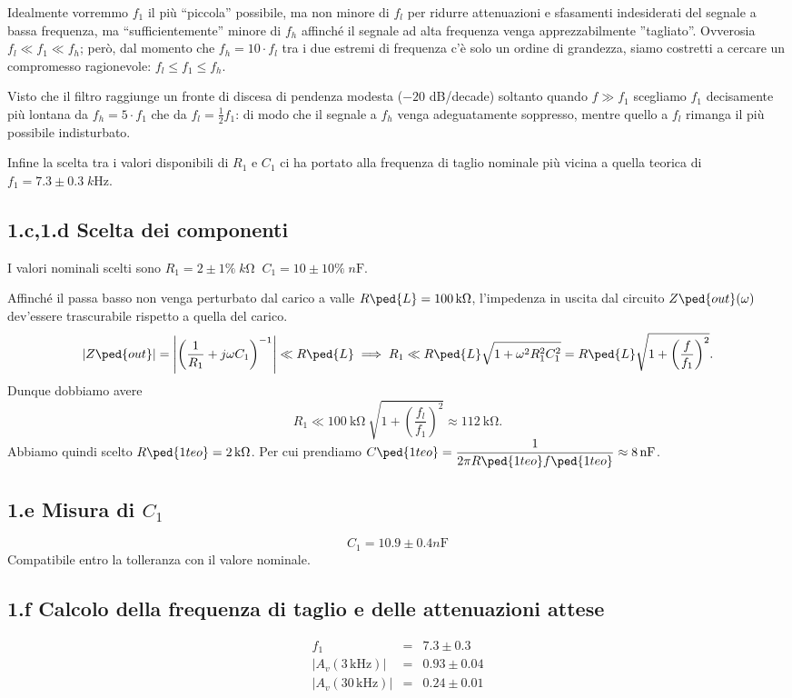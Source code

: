 \documentclass[10pt,a4paper]{article}
\begin{document}
Idealmente vorremmo $f_1$ il più ``piccola'' possibile, ma non minore
di $f_l$ per ridurre attenuazioni e sfasamenti indesiderati del segnale
a bassa frequenza, ma ``sufficientemente'' minore di $f_h $ affinché il
segnale ad alta frequenza venga apprezzabilmente ''tagliato''. Ovverosia
$f_l \ll f_1 \ll f_h$; però, dal momento che $f_h = 10 \cdot f_l$ tra i due
estremi di frequenza c'è solo un ordine di grandezza, siamo costretti a
cercare un compromesso ragionevole: $f_l \leq f_1 \leq f_h$.

Visto che il filtro raggiunge un fronte di discesa di pendenza modesta
($-20$ dB/decade) soltanto quando $f \gg f_1$ scegliamo $f_1$ decisamente
più lontana da $f_h = 5 \cdot f_1$ che da $f_l = \frac{1}{2} f_1$:
di modo che il segnale a $f_h$ venga adeguatamente soppresso, mentre quello
a $f_l$ rimanga il più possibile indisturbato.

Infine la scelta tra i valori disponibili di $R_1$ e $C_1$ ci ha portato alla
frequenza di taglio nominale più vicina a quella teorica di 
$f_1 = 7.3 \pm 0.3 \; \si{k\Hz}$. 

\subsection*{1.c,1.d Scelta dei componenti}

I valori nominali scelti sono $R_1 = 2 \pm 1\% \; \si{k\ohm} \;\; 
C_1 = 10 \pm 10\% \; \si{n\F}$.  

Affinché il passa basso non venga perturbato dal carico a valle
$R\ped{L} = \SI{100}{\kilo\ohm}$, l'impedenza in uscita dal circuito
$Z\ped{out}(\omega)$ dev'essere trascurabile rispetto a quella del carico.
\[
\abs{Z\ped{out}} = \abs{\left(\frac{1}{R_1} + j\omega 
C_1\right)^{-1}} \ll R\ped{L} \implies R_1 \ll
R\ped{L} \sqrt{1 + \omega^2 R_1^2 C_1^2} =
R\ped{L} \sqrt{1 + \left(\frac{f}{f_1}\right)^2}.
\]
Dunque dobbiamo avere
\[
R_1 \ll \SI{100}{\kilo\ohm}  \ \sqrt{1 + 
\left(\frac{f_l}{f_1}\right)^2} \approx \SI{112}{\kilo\ohm}.
\]
Abbiamo quindi scelto $R\ped{1 teo} = \SI{2}{\kilo\ohm}$.
Per cui prendiamo $C\ped{1 teo} =
\ds \frac{1}{2\pi R\ped{1 teo} f\ped{1 teo}} \approx \SI{8}{\nano\farad}$. 
\subsection*{1.e Misura di $C_1$}
\[
C_1 = 10.9 \pm 0.4 \si{n\F}
\]
Compatibile entro la tolleranza con il valore nominale.

\subsection*{1.f Calcolo della frequenza di taglio e delle attenuazioni attese}
\[
\begin{array}{rcl}
f_1 &=& 7.3 \pm 0.3\\
|A_v(3\,\mathrm{kHz})| &=& 0.93 \pm 0.04 \\
|A_v(30\,\mathrm{kHz})| &=& 0.24 \pm 0.01
\end{array}
\]
\end{document}
